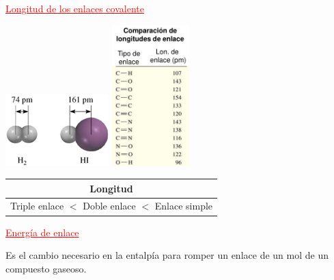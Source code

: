         \begin{center} \textcolor{red}{\underline{Longitud de los enlaces covalente}} \end{center}
        \begin{center} \includegraphics[width=4cm]{./imagenes/longitudEnlCovalenteH2yHI.png} \includegraphics[width=3cm]{./imagenes/comparacionDeLongitudesDeEnlace.png} \end{center}
        \begin{center} 
            \begin{tabular}{| c |}
                \toprule
                \textbf{Longitud} \\
                \midrule
                Triple enlace $<$ Doble enlace $<$ Enlace simple \\
                \bottomrule
            \end{tabular}
        \end{center}
        \begin{center} \textcolor{red}{\underline{Energía de enlace}} \end{center}
        \sangria{} Es el cambio necesario en la entalpía para romper un enlace de un mol de un compuesto gaseoso.
